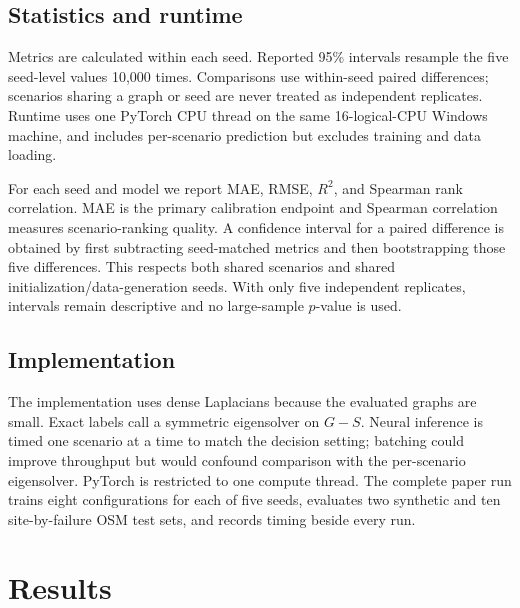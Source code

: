 \documentclass[11pt]{amsart}
\begin{document}
\subsection{Statistics and runtime}
Metrics are calculated within each seed. Reported 95\% intervals resample the
five seed-level values 10,000 times. Comparisons use within-seed paired
differences; scenarios sharing a graph or seed are never treated as independent
replicates. Runtime uses one PyTorch CPU thread on the same 16-logical-CPU
Windows machine, and includes per-scenario prediction but excludes training and
data loading.

For each seed and model we report MAE, RMSE, $R^2$, and Spearman rank
correlation. MAE is the primary calibration endpoint and Spearman correlation
measures scenario-ranking quality. A confidence interval for a paired
difference is obtained by first subtracting seed-matched metrics and then
bootstrapping those five differences. This respects both shared scenarios and
shared initialization/data-generation seeds. With only five independent
replicates, intervals remain descriptive and no large-sample $p$-value is used.

\subsection{Implementation}
The implementation uses dense Laplacians because the evaluated graphs are
small. Exact labels call a symmetric eigensolver on $G-S$. Neural inference is
timed one scenario at a time to match the decision setting; batching could
improve throughput but would confound comparison with the per-scenario
eigensolver. PyTorch is restricted to one compute thread. The complete paper
run trains eight configurations for each of five seeds, evaluates two synthetic
and ten site-by-failure OSM test sets, and records timing beside every run.

\section{Results}
\end{document}
